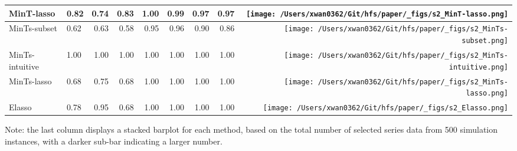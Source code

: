 \documentclass[
  11pt]{article}
\begin{document}
\begin{table}
\begin{threeparttable}
\begin{tabular}{llrrrrrr>{}r}
MinT-lasso & 0.82 & 0.74 & 0.83 & 1.00 & 0.99 & 0.97 & 0.97 & \texttt{[image: /Users/xwan0362/Git/hfs/paper/\_figs/s2\_MinT-lasso.png]}\\
\midrule
MinTs-subset & 0.62 & 0.63 & 0.58 & 0.95 & 0.96 & 0.90 & 0.86 & \texttt{[image: /Users/xwan0362/Git/hfs/paper/\_figs/s2\_MinTs-subset.png]}\\
MinTs-intuitive & 1.00 & 1.00 & 1.00 & 1.00 & 1.00 & 1.00 & 1.00 & \texttt{[image: /Users/xwan0362/Git/hfs/paper/\_figs/s2\_MinTs-intuitive.png]}\\
MinTs-lasso & 0.68 & 0.75 & 0.68 & 1.00 & 1.00 & 1.00 & 1.00 & \texttt{[image: /Users/xwan0362/Git/hfs/paper/\_figs/s2\_MinTs-lasso.png]}\\
\midrule
Elasso & 0.78 & 0.95 & 0.68 & 1.00 & 1.00 & 1.00 & 1.00 & \texttt{[image: /Users/xwan0362/Git/hfs/paper/\_figs/s2\_Elasso.png]}\\
\bottomrule
\end{tabular}
\begin{tablenotes}[para]
\item Note: the last column displays a stacked barplot for each method, based on the total number of selected series data from 500 simulation instances, with a darker sub-bar indicating a larger number.
\end{tablenotes}
\end{threeparttable}
\endgroup{}
\end{table}
\end{document}
